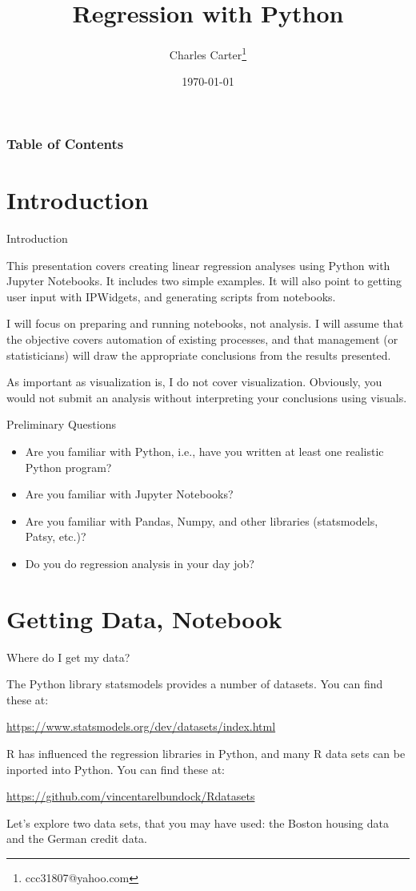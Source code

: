 \documentclass{beamer}
\title{Regression with Python}
\author{Charles Carter\thanks{ccc31807@yahoo.com}}
\institute{Columbus Data Science Meetup}
\date{\today}
\begin{document}
\frame{\titlepage}


\begin{frame}
\frametitle{Table of Contents}
\tableofcontents
\end{frame}


\section{Introduction}

\begin{frame}
    \LARGE Introduction

    \normalsize
    This presentation covers creating linear regression analyses using Python with Jupyter Notebooks. It includes two simple examples. It will also point to getting user input with IPWidgets, and generating scripts from notebooks.

    I will focus on preparing and running notebooks, not analysis. I will assume that the objective covers automation of existing processes, and that management (or statisticians) will draw the appropriate conclusions from the results presented.
    
    As important as visualization is, I do not cover visualization. Obviously, you would not submit an analysis without interpreting your conclusions using visuals.
\end{frame}

\begin{frame}
    \LARGE Preliminary Questions

    \normalsize
    \begin{itemize}
        \item Are you familiar with Python, i.e., have you written at least one realistic Python program?
        \item Are you familiar with Jupyter Notebooks? 
        \item Are you familiar with Pandas, Numpy, and other libraries (statsmodels, Patsy, etc.)?
        \item Do you do regression analysis in your day job?
    \end{itemize}
    
\end{frame}

\section{Getting Data, Notebook}

\begin{frame}
    \LARGE Where do I get my data?

    \normalsize
   The Python library statsmodels provides a number of datasets. You can find these at:

    \url{https://www.statsmodels.org/dev/datasets/index.html}

R has influenced the regression libraries in Python, and many R data sets can be inported into Python. You can find these at:

    \url{https://github.com/vincentarelbundock/Rdatasets}

Let's explore two data sets, that you may have used: the Boston housing data and the German credit data. 
\end{frame}
\end{document}
